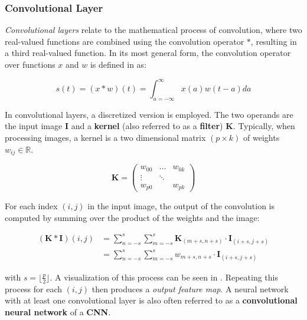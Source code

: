 \subsubsection{Convolutional Layer}

\textit{Convolutional layers} relate to the mathematical process of convolution, where two real-valued functions are combined using the convolution operator $*$, resulting in a third real-valued function.
In its most general form, the convolution operator over functions $x$ and $w$ is defined in \cite{goodfellow_deep_2016} as:

\begin{equation}
    s(t) = (x * w)(t) = \int_{a=-\infty}^{\infty} x(a)w(t-a)  da
\end{equation}

In convolutional layers, a discretized version is employed.
The two operands are the input image $\bm{I}$ and a \textbf{kernel} (also referred to as a \textbf{filter}) $\bm{K}$.
Typically, when processing images, a kernel is a two dimensional matrix $(p \times k)$ of weights $w_{ij} \in \mathbb{R}$.

\begin{equation}
    \label{eq:kernel_definition}
    \bm{K} =
    \begin{pmatrix}
        w_{00} & \dots  & w_{0k} \\
        \vdots & \ddots & \\
        w_{p0} &        & w_{pk}
    \end{pmatrix}
\end{equation}

For each index $(i,j)$ in the input image, the output of the convolution is computed by summing over the product of the weights and the image:

\begin{equation}
    \begin{split}
        (\bm{K} * \bm{I})(i,j)
        &= \sum_{n=-s}^s \sum_{m=-s}^s \bm{K}_{(m+s, n+s)} \cdot \bm{I}_{(i+s, j+s)} \\
        &= \sum_{n=-s}^s \sum_{m=-s}^s w_{m+s, n+s} \cdot \bm{I}_{(i+s, j+s)}
    \end{split}
\end{equation}

with $s = \lfloor \frac{p}{2} \rfloor$.
A visualization of this process can be seen in .
Repeating this process for each $(i,j)$ then produces a \textit{output feature map}.
A neural network with at least one convolutional layer is also often referred to as a \textbf{convolutional neural network} of a \textbf{CNN}.

